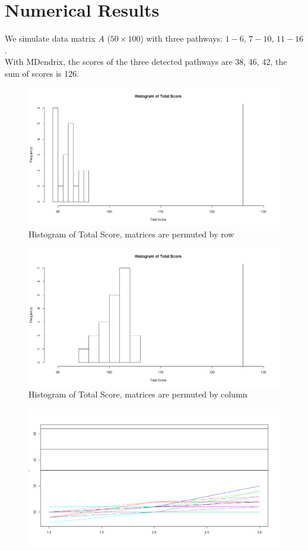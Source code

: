 \documentclass[xcolor=dvipsnames]{beamer}
\begin{document}
\section{Numerical Results}
\begin{frame}
We simulate data matrix $A$ ($50\times 100$) with three pathways: $1-6$, $7-10$, $11-16$.\\
With MDendrix, the scores of the three detected pathways are 38, 46, 42, the sum of scores is 126.\\
\begin{figure}
\centering
\includegraphics[width=0.9\linewidth]{histrow.png}
\caption{Histogram of Total Score, matrices are permuted by row}
\end{figure}
\end{frame}
\begin{frame}
\begin{figure}
\centering
\includegraphics[width=0.9\linewidth]{histcol.png}
\caption{Histogram of Total Score, matrices are permuted by column}
\end{figure}
\end{frame}
\begin{frame}
\begin{figure}
\centering
\includegraphics[width=0.9\linewidth]{byrowmat.png}
\end{figure}
\end{frame}
\end{document}
